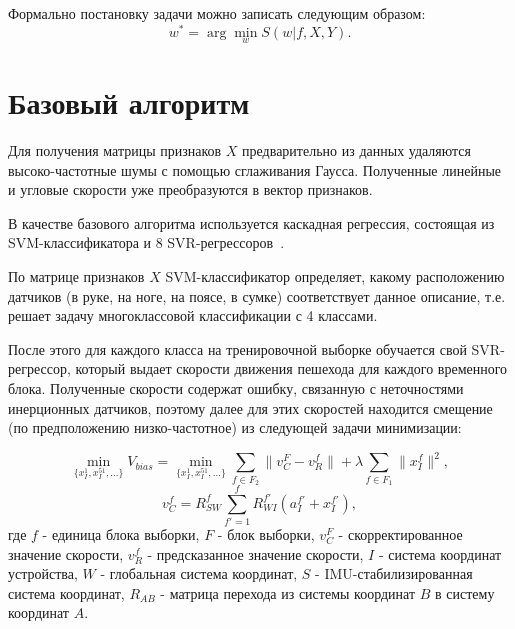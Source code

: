 \documentclass[12pt,twoside]{article}
\begin{document}

Формально постановку задачи можно записать следующим образом:
\[w^* = \arg\min_{w}S(w|f, X, Y).\]

\section{Базовый алгоритм}

Для получения матрицы признаков $X$ предварительно из данных удаляются высоко-частотные шумы с помощью сглаживания Гаусса. Полученные линейные и угловые скорости уже преобразуются в вектор признаков.

В качестве базового алгоритма используется каскадная регрессия, состоящая из SVM-классификатора и 8 SVR-регрессоров~\cite{journals/corr/abs-1712-09004}. 

По матрице признаков $X$ SVM-классификатор определяет, какому расположению датчиков (в руке, на ноге, на поясе, в сумке) соответствует данное описание, т.е. решает задачу многоклассовой классификации с 4 классами.

После этого для каждого класса на тренировочной выборке обучается свой SVR-регрессор, который выдает скорости движения пешехода для каждого временного блока. Полученные скорости содержат ошибку, связанную с неточностями инерционных датчиков, поэтому далее для этих скоростей находится смещение (по предположению низко-частотное) из следующей задачи минимизации:

\[\min_{\{x^1_I, x^51_I,\dots\}}V_{bias}=
\min_{\{x^1_I, x^51_I,\dots\}}\sum_{f \in F_2}\|v_C^F-v_R^f\|+
\lambda\sum_{f \in F_1}\|x^f_I\|^2,\]
\[v_C^f = R_{SW}^f\sum_{f'=1}^f R_{WI}^{f'}(a_I^{f'}+x_I^{f'}),\]
где $f$ - единица блока выборки, $F$ - блок выборки, $v_C^F$ - скорректированное значение скорости, $v_R^f$ - предсказанное значение скорости, $I$ - система координат устройства, $W$ - глобальная система координат, $S$ - IMU-стабилизированная система координат, $R_{AB}$ - матрица перехода из системы координат $B$ в систему координат $A$.
\end{document}
